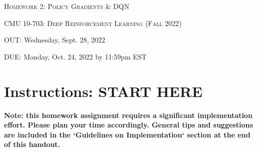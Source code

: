 \documentclass[12pt]{article}
\begin{document}
\section*{}
\begin{center}
  \centerline{\textsc{\LARGE  Homework 2: Policy Gradients \& DQN}}
  \vspace{1em}
  \textsc{\large CMU 10-703: Deep Reinforcement Learning (Fall 2022)} \\
  \vspace{1em}
  \centerline{OUT: Wednesday, Sept. 28, 2022}
  \centerline{DUE: Monday, Oct. 24, 2022 by 11:59pm EST}
\end{center}

\section*{Instructions: START HERE}
\textbf{Note: this homework assignment requires a significant implementation effort. Please plan your time accordingly. General tips and suggestions are included in the `Guidelines on Implementation` section at the end of this handout.}
\end{document}
